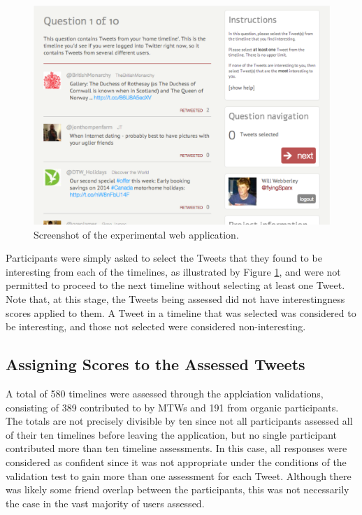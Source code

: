 \begin{figure}[h]
\centering
\includegraphics[scale=0.35]{5.Chapter3/Media/twinterest.png} 
\caption{Screenshot of the experimental web application.}
\label{fig:twinterest}
\end{figure}

Participants were simply asked to select the Tweets that they found to be interesting from each of the timelines, as illustrated by Figure \ref{fig:twinterest}, and were not permitted to proceed to the next timeline without selecting at least one Tweet. Note that, at this stage, the Tweets being assessed did not have interestingness scores applied to them. A Tweet in a timeline that was selected was considered to be interesting, and those not selected were considered non-interesting.


\subsection{Assigning Scores to the Assessed Tweets}
A total of 580 timelines were assessed through the applciation validations, consisting of 389 contributed to by MTWs and 191 from organic participants. The totals are not precisely divisible by ten since not all participants assessed all of their ten timelines before leaving the application, but no single participant contributed more than ten timeline assessments. In this case, all responses were considered as confident since it was not appropriate under the conditions of the validation test to gain more than one assessment for each Tweet. Although there was likely some friend overlap between the participants, this was not necessarily the case in the vast majority of users assessed.  

